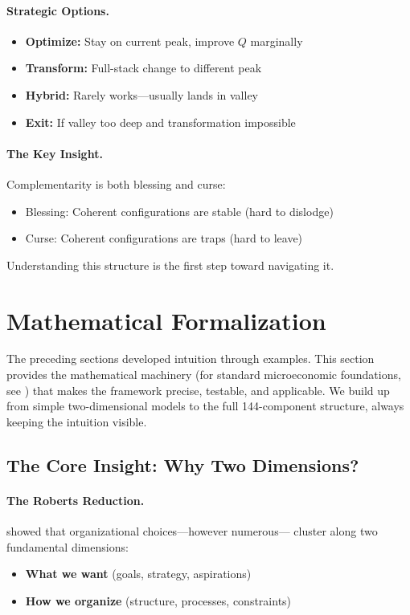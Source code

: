 \documentclass[12pt,a4paper]{article}
\begin{document}
\paragraph{Strategic Options.}
\begin{itemize}
  \item \textbf{Optimize:} Stay on current peak, improve $Q$ marginally
  \item \textbf{Transform:} Full-stack change to different peak
  \item \textbf{Hybrid:} Rarely works---usually lands in valley
  \item \textbf{Exit:} If valley too deep and transformation impossible
\end{itemize}

\paragraph{The Key Insight.}
Complementarity is both blessing and curse:
\begin{itemize}
  \item Blessing: Coherent configurations are stable (hard to dislodge)
  \item Curse: Coherent configurations are traps (hard to leave)
\end{itemize}

Understanding this structure is the first step toward navigating it.

\section{Mathematical Formalization}
\label{sec:mathformalization}

The preceding sections developed intuition through examples.
This section provides the mathematical machinery (for standard microeconomic foundations, see \citealt{mascolell1995}) that makes the framework precise,
testable, and applicable. We build up from simple two-dimensional models
to the full 144-component structure, always keeping the intuition visible.

\subsection{The Core Insight: Why Two Dimensions?}

\paragraph{The Roberts Reduction.}
\citet{roberts2004} showed that organizational choices---however numerous---
cluster along two fundamental dimensions:
\begin{itemize}
  \item \textbf{What we want} (goals, strategy, aspirations)
  \item \textbf{How we organize} (structure, processes, constraints)
\end{itemize}
\end{document}
